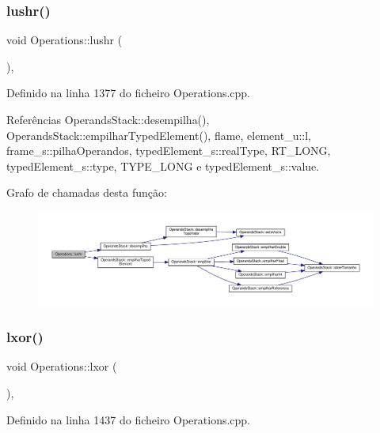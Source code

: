 \subsubsection{\texorpdfstring{lushr()}{lushr()}}
{\footnotesize\ttfamily void Operations\+::lushr (\begin{DoxyParamCaption}{ }\end{DoxyParamCaption})\hspace{0.3cm}{\ttfamily [static]}, {\ttfamily [private]}}



Definido na linha 1377 do ficheiro Operations.\+cpp.



Referências Operands\+Stack\+::desempilha(), Operands\+Stack\+::empilhar\+Typed\+Element(), flame, element\+\_\+u\+::l, frame\+\_\+s\+::pilha\+Operandos, typed\+Element\+\_\+s\+::real\+Type, R\+T\+\_\+\+L\+O\+NG, typed\+Element\+\_\+s\+::type, T\+Y\+P\+E\+\_\+\+L\+O\+NG e typed\+Element\+\_\+s\+::value.

Grafo de chamadas desta função\+:
\nopagebreak
\begin{figure}[H]
\begin{center}
\leavevmode
\includegraphics[width=350pt]{classOperations_a3b7c61f8bca7b3ad0dacae6649aee042_cgraph}
\end{center}
\end{figure}
\mbox{\label{classOperations_ac135e723f1ac6a27c736e6b8e7d06a45}} 
\subsubsection{\texorpdfstring{lxor()}{lxor()}}
{\footnotesize\ttfamily void Operations\+::lxor (\begin{DoxyParamCaption}{ }\end{DoxyParamCaption})\hspace{0.3cm}{\ttfamily [static]}, {\ttfamily [private]}}



Definido na linha 1437 do ficheiro Operations.\+cpp.



